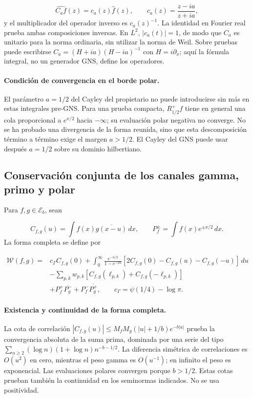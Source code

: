 \[
\widehat{C_af}(z)=c_a(z)\widehat f(z),\qquad
c_a(z)=\frac{z-ia}{z+ia},
\]
y el multiplicador del operador inverso es \(c_a(z)^{-1}\). La identidad en Fourier real prueba ambas composiciones inversas. En \(L^2\), \(|c_a(t)|=1\), de modo que \(C_a\) es unitario para la norma ordinaria, sin utilizar la norma de Weil. Sobre pruebas puede escribirse \(C_a=(H+ia)(H-ia)^{-1}\) con \(H=i\partial_x\); aquí la fórmula integral, no un generador GNS, define los operadores.

\paragraph{Condición de convergencia en el borde polar.} El parámetro \(a=1/2\) del Cayley del propietario no puede introducirse sin más en estas integrales pre-GNS. Para una prueba compacta, \(R_{1/2}^+f\) tiene en general una cola proporcional a \(e^{x/2}\) hacia \(-\infty\); su evaluación polar negativa no converge. No se ha probado una divergencia de la forma reunida, sino que esta descomposición término a término exige el margen \(a>1/2\). El Cayley del GNS puede usar después \(a=1/2\) sobre su dominio hilbertiano.


\subsection{Conservación conjunta de los canales gamma, primo y polar}
\label{viii:tm-add-m5}
Para \(f,g\in\mathscr E_b\), sean

\[
C_{f,g}(u)=\int f(x)\overline{g(x-u)}\,dx,
\qquad P_f^\pm=\int f(x)e^{\pm x/2}\,dx.
\]
La forma completa se define por

\[
\begin{aligned}
\mathscr W(f,g)={}&c_\Gamma C_{f,g}(0)
+\int_0^\infty\frac{e^{-u/2}}{1-e^{-2u}}
 [2C_{f,g}(0)-C_{f,g}(u)-C_{f,g}(-u)]\,du\\
&-\sum_{p,k}w_{p,k}
 [C_{f,g}(\ell_{p,k})+C_{f,g}(-\ell_{p,k})]\\
&+P_f^+\overline{P_g^-}+P_f^-\overline{P_g^+},
\qquad c_\Gamma=\psi(1/4)-\log\pi.
\end{aligned}
\]
\paragraph{Existencia y continuidad de la forma completa.} La cota de correlación \(|C_{f,g}(u)|\le M_fM_g(|u|+1/b)e^{-b|u|}\) prueba la convergencia absoluta de la suma prima, dominada por una serie del tipo \(\sum_{n\ge2}(\log n)(1+\log n)n^{-b-1/2}\). La diferencia simétrica de correlaciones es \(O(u^2)\) en cero, mientras el peso gamma es \(O(u^{-1})\); en infinito el peso es exponencial. Las evaluaciones polares convergen porque \(b>1/2\). Estas cotas prueban también la continuidad en los seminormas indicados. No se usa positividad.

